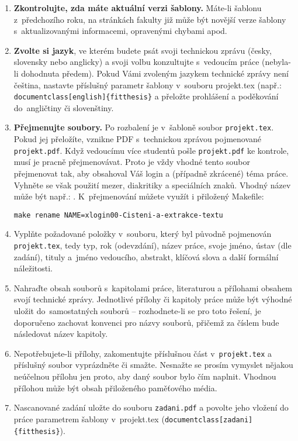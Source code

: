 \begin{enumerate}
  \item \textbf{Zkontrolujte, zda máte aktuální verzi šablony.} Máte-li šablonu z~předchozího roku, na stránkách fakulty již může být novější verze šablony s~aktualizovanými informacemi, opravenými chybami apod.
  \item \textbf{Zvolte si jazyk}, ve kterém budete psát svoji technickou zprávu (česky, slovensky nebo anglicky) a svoji volbu konzultujte s~vedoucím práce (nebyla-li dohodnuta předem). Pokud Vámi zvoleným jazykem technické zprávy není čeština, nastavte příslušný parametr šablony v~souboru projekt.tex (např.: \verb|documentclass[english]{fitthesis}| a přeložte prohlášení a poděkování do~angličtiny či slovenštiny.
  \item \textbf{Přejmenujte soubory.} Po rozbalení je v~šabloně soubor \texttt{projekt.tex}. Pokud jej přeložíte, vznikne PDF s~technickou zprávou pojmenované \texttt{projekt.pdf}. Když vedoucímu více studentů pošle \texttt{projekt.pdf} ke kontrole, musí je pracně přejmenovávat. Proto je vždy vhodné tento soubor přejmenovat tak, aby obsahoval Váš login a (případně zkrácené) téma práce. Vyhněte se však použití mezer, diakritiky a speciálních znaků. Vhodný název může být např.: . K~přejmenování můžete využít i přiložený Makefile:
\begin{verbatim}
make rename NAME=xlogin00-Cisteni-a-extrakce-textu
\end{verbatim}
  \item Vyplňte požadované položky v~souboru, který byl původně pojmenován \texttt{projekt.tex}, tedy typ, rok (odevzdání), název práce, svoje jméno, ústav (dle zadání), tituly a~jméno vedoucího, abstrakt, klíčová slova a další formální náležitosti.
  \item Nahraďte obsah souborů s~kapitolami práce, literaturou a přílohami obsahem svojí technické zprávy. Jednotlivé přílohy či kapitoly práce může být výhodné uložit do~samostatných souborů -- rozhodnete-li se pro toto řešení, je doporučeno zachovat konvenci pro názvy souborů, přičemž za číslem bude následovat název kapitoly. 
  \item Nepotřebujete-li přílohy, zakomentujte příslušnou část v~\texttt{projekt.tex} a příslušný soubor vyprázdněte či smažte. Nesnažte se prosím vymyslet nějakou neúčelnou přílohu jen proto, aby daný soubor bylo čím naplnit. Vhodnou přílohou může být obsah přiloženého paměťového média.
  \item Nascanované zadání uložte do souboru \texttt{zadani.pdf} a povolte jeho vložení do práce parametrem šablony v~projekt.tex (\verb|documentclass[zadani]{fitthesis}|).

\end{enumerate}
